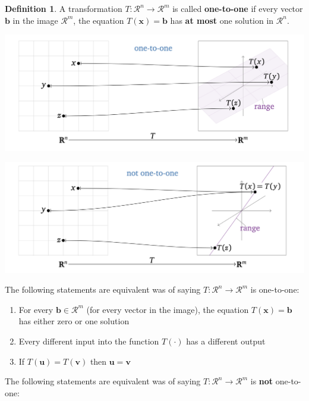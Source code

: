 \documentclass[
]{book}
\theoremstyle{definition}
\newtheorem{definition}{Definition}[chapter]
\theoremstyle{definition}
\theoremstyle{definition}
\theoremstyle{remark}
\begin{document}
\begin{definition}
\protect\hypertarget{def:unnamed-chunk-119}{}{\label{def:unnamed-chunk-119} }A transformation \(T:\mathcal{R}^n \rightarrow \mathcal{R}^m\) is called \textbf{one-to-one} if every vector \(\mathbf{b}\) in the image \(\mathcal{R}^m\), the equation \(T(\mathbf{x}) = \mathbf{b}\) has \textbf{at most} one solution in \(\mathcal{R}^n\).
\end{definition}

\includegraphics[width=18.53in]{images/one-to-one}

\includegraphics[width=18.64in]{images/not-one-to-one}

The following statements are equivalent was of saying \(T:\mathcal{R}^n \rightarrow \mathcal{R}^m\) is one-to-one:

\begin{enumerate}
\def\labelenumi{\alph{enumi})}
\item
  For every \(\mathbf{b} \in \mathcal{R}^m\) (for every vector in the image), the equation \(T(\mathbf{x}) = \mathbf{b}\) has either zero or one solution
\item
  Every different input into the function \(T(\cdot)\) has a different output
\item
  If \(T(\mathbf{u}) = T(\mathbf{v})\) then \(\mathbf{u} = \mathbf{v}\)
\end{enumerate}

The following statements are equivalent was of saying \(T:\mathcal{R}^n \rightarrow \mathcal{R}^m\) is \textbf{not} one-to-one:
\end{document}
